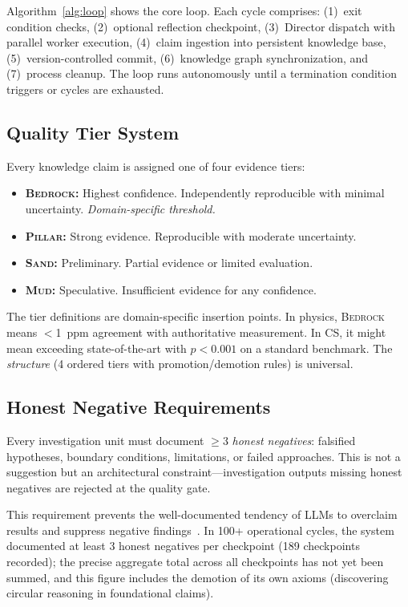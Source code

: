 \documentclass[11pt,a4paper]{article}
\newcommand{\bedrock}{\textsc{Bedrock}}
\newcommand{\pillar}{\textsc{Pillar}}
\newcommand{\sand}{\textsc{Sand}}
\newcommand{\mud}{\textsc{Mud}}
\begin{document}
Algorithm~\ref{alg:loop} shows the core loop. Each cycle comprises: (1)~exit condition
checks, (2)~optional reflection checkpoint, (3)~Director dispatch with parallel
worker execution, (4)~claim ingestion into persistent knowledge base,
(5)~version-controlled commit, (6)~knowledge graph synchronization, and
(7)~process cleanup. The loop runs autonomously until a termination condition
triggers or cycles are exhausted.

\subsection{Quality Tier System}
\label{sec:tiers}

Every knowledge claim is assigned one of four evidence tiers:

\begin{itemize}[nosep]
    \item \textbf{\bedrock{}:} Highest confidence. Independently reproducible with
          minimal uncertainty. \emph{Domain-specific threshold.}
    \item \textbf{\pillar{}:} Strong evidence. Reproducible with moderate uncertainty.
    \item \textbf{\sand{}:} Preliminary. Partial evidence or limited evaluation.
    \item \textbf{\mud{}:} Speculative. Insufficient evidence for any confidence.
\end{itemize}

The tier definitions are domain-specific insertion points. In physics, \bedrock{}
means $<$1~ppm agreement with authoritative measurement. In CS, it might mean
exceeding state-of-the-art with $p < 0.001$ on a standard benchmark. The
\emph{structure} (4 ordered tiers with promotion/demotion rules) is universal.

\subsection{Honest Negative Requirements}
\label{sec:honest_neg}

Every investigation unit must document $\geq$3 \emph{honest negatives}: falsified
hypotheses, boundary conditions, limitations, or failed approaches. This is not a
suggestion but an architectural constraint---investigation outputs missing honest
negatives are rejected at the quality gate.

This requirement prevents the well-documented tendency of LLMs to overclaim results
and suppress negative findings~\cite{overclaiming}. In 100+ operational cycles,
the system documented at least 3 honest negatives per checkpoint (189 checkpoints
recorded); the precise aggregate total across all checkpoints has not yet been
summed, and this figure includes the demotion of its own axioms (discovering
circular reasoning in foundational claims).
\end{document}

